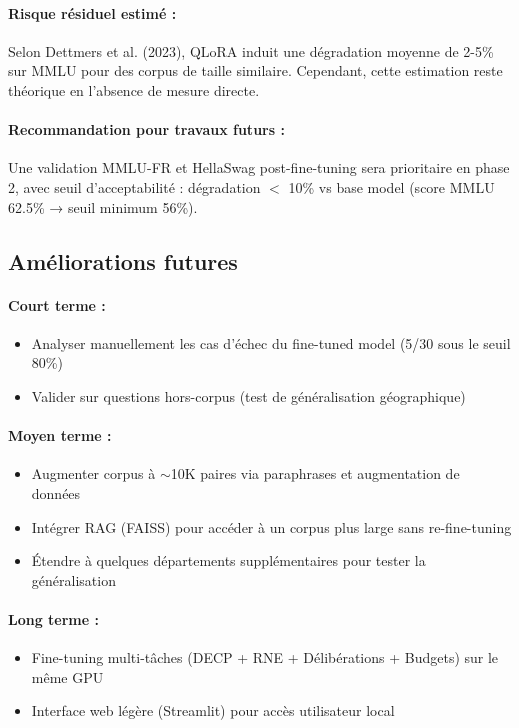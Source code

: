 \paragraph{Risque résiduel estimé :}
Selon Dettmers et al. (2023), QLoRA induit une dégradation moyenne de 2-5\% sur MMLU pour des corpus de taille similaire. Cependant, cette estimation reste théorique en l'absence de mesure directe.

\paragraph{Recommandation pour travaux futurs :}
Une validation MMLU-FR et HellaSwag post-fine-tuning sera prioritaire en phase 2, avec seuil d'acceptabilité : dégradation $<$ 10\% vs base model (score MMLU 62.5\% → seuil minimum 56\%).

\subsection{Améliorations futures}

\paragraph{Court terme :}
\begin{itemize}
    \item Analyser manuellement les cas d'échec du fine-tuned model (5/30 sous le seuil 80\%)
    \item Valider sur questions hors-corpus (test de généralisation géographique)
\end{itemize}

\paragraph{Moyen terme :}
\begin{itemize}
    \item Augmenter corpus à $\sim$10K paires via paraphrases et augmentation de données
    \item Intégrer RAG (FAISS) pour accéder à un corpus plus large sans re-fine-tuning
    \item Étendre à quelques départements supplémentaires pour tester la généralisation
\end{itemize}

\paragraph{Long terme :}
\begin{itemize}
    \item Fine-tuning multi-tâches (DECP + RNE + Délibérations + Budgets) sur le même GPU
    \item Interface web légère (Streamlit) pour accès utilisateur local
\end{itemize}

